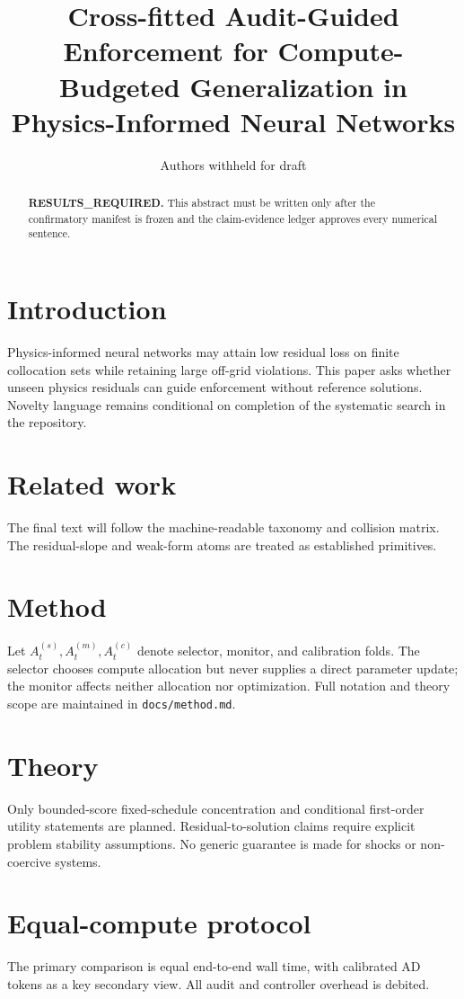 \documentclass[review,12pt]{elsarticle}
\begin{document}
\begin{frontmatter}
\title{Cross-fitted Audit-Guided Enforcement for Compute-Budgeted Generalization in Physics-Informed Neural Networks}
\author{Authors withheld for draft}

\begin{abstract}
\textbf{RESULTS\_REQUIRED.} This abstract must be written only after the
confirmatory manifest is frozen and the claim-evidence ledger approves every
numerical sentence.
\end{abstract}
\end{frontmatter}

\section{Introduction}
Physics-informed neural networks may attain low residual loss on finite
collocation sets while retaining large off-grid violations. This paper asks
whether unseen physics residuals can guide enforcement without reference
solutions. Novelty language remains conditional on completion of the systematic
search in the repository.

\section{Related work}
The final text will follow the machine-readable taxonomy and collision matrix.
The residual-slope and weak-form atoms are treated as established primitives.

\section{Method}
Let \(A_t^{(s)},A_t^{(m)},A_t^{(c)}\) denote selector, monitor, and calibration
folds. The selector chooses compute allocation but never supplies a direct
parameter update; the monitor affects neither allocation nor optimization.
Full notation and theory scope are maintained in \texttt{docs/method.md}.

\section{Theory}
Only bounded-score fixed-schedule concentration and conditional first-order
utility statements are planned. Residual-to-solution claims require explicit
problem stability assumptions. No generic guarantee is made for shocks or
non-coercive systems.

\section{Equal-compute protocol}
The primary comparison is equal end-to-end wall time, with calibrated AD tokens
as a key secondary view. All audit and controller overhead is debited.
\end{document}
